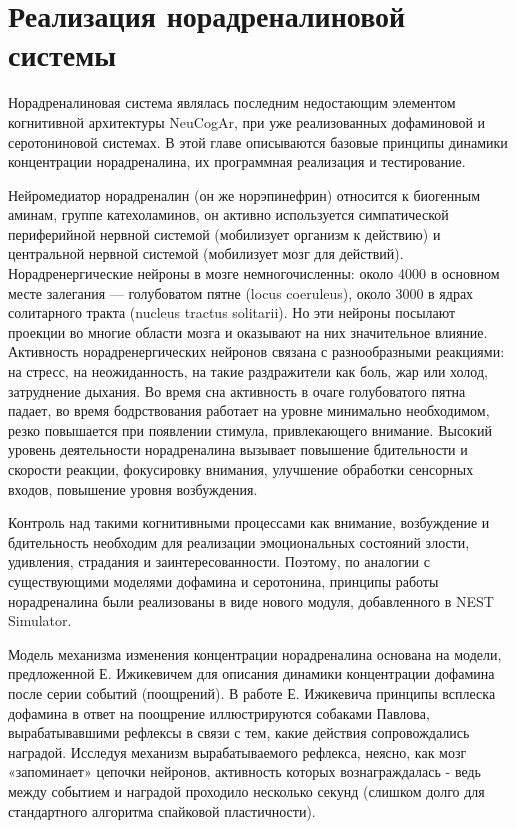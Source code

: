 \chapter{Реализация норадреналиновой системы}
\label{chap:specification}
Норадреналиновая система являлась последним недостающим элементом когнитивной архитектуры NeuCogAr, при уже реализованных дофаминовой и серотониновой системах. В этой главе описываются базовые принципы динамики концентрации норадреналина, их программная реализация и тестирование.

Нейромедиатор норадреналин (он же норэпинефрин) относится к биогенным аминам, группе катехоламинов, он активно используется симпатической периферийной нервной системой (мобилизует организм к действию) и центральной нервной системой (мобилизует мозг для действий).\cite{noradrenalin3} Норадренергические нейроны в мозге немногочисленны: около 4000 в основном месте залегания — голубоватом пятне (locus coeruleus), около 3000 в ядрах солитарного тракта (nucleus tractus solitarii).\cite{masuko, rat_data5} Но эти нейроны посылают проекции во многие области мозга и оказывают на них значительное влияние. Активность норадренергических нейронов связана с разнообразными реакциями: на стресс, на неожиданность, на такие раздражители как боль, жар или холод, затруднение дыхания. Во время сна активность в очаге голубоватого пятна падает, во время бодрствования работает на уровне минимально необходимом, резко повышается при появлении стимула, привлекающего внимание.\cite{Berridge2003} Высокий уровень деятельности норадреналина вызывает повышение бдительности и скорости реакции, фокусировку внимания, улучшение обработки сенсорных входов, повышение уровня возбуждения.


Контроль над такими когнитивными процессами как внимание, возбуждение и бдительность необходим для реализации эмоциональных состояний злости, удивления, страдания и заинтересованности. Поэтому, по аналогии с существующими моделями дофамина и серотонина, принципы работы норадреналина были реализованы в виде нового модуля, добавленного в NEST Simulator.


Модель механизма изменения концентрации норадреналина основана на модели, предложенной Е. Ижикевичем для описания динамики концентрации дофамина после серии событий (поощрений).\cite{izhikevich} В работе Е. Ижикевича принципы всплеска дофамина в ответ на поощрение иллюстрируются собаками Павлова, вырабатывавшими рефлексы в связи с тем, какие действия сопровождались наградой. Исследуя механизм вырабатываемого рефлекса, неясно, как мозг «запоминает» цепочки нейронов, активность которых вознаграждалась - ведь между событием и наградой проходило несколько секунд (слишком долго для стандартного алгоритма спайковой пластичности).


